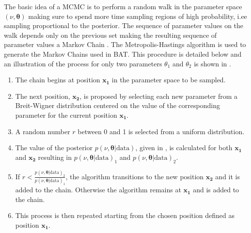 The basic idea of a MCMC is to perform a random walk in the parameter space
$(\nu,\boldsymbol{\theta})$ making sure to spend more time sampling regions of
high probability, i.ee sampling proportional to the posterior.  The sequence of
parameter values on the walk depends only on the previous set making the
resulting sequence of parameter values a Markov Chain \cite{Markov2006}.  The
Metropolis-Hastings algorithm \cite{10.2307/2334940,Beresford:2642397} is used
to generate the Markov Chains used in BAT.  This procedure is detailed below
and an illustration of the process for only two parameters $\theta_{1}$ and
$\theta_{2}$ is shown in .
%
\begin{enumerate}
\item The chain begins at position $\boldsymbol{x_{1}}$ in the parameter space to be sampled.
\item The next position, $\boldsymbol{x_{2}}$, is proposed by selecting each new parameter from a Breit-Wigner distribution centered on the value of the corresponding parameter for the current position $\boldsymbol{x_{1}}$.
\item A random number $r$ between 0 and 1 is selected from a uniform distribution.
\item The value of the posterior $p(\nu,\boldsymbol{\theta}|\text{data})$, given in , is calculated for both  $\boldsymbol{x_{1}}$ and  $\boldsymbol{x_{2}}$ resulting in $p(\nu,\boldsymbol{\theta}|\text{data})_{1}$ and $p(\nu,\boldsymbol{\theta}|\text{data})_{2}$.
\item If $r < \frac{p(\nu,\boldsymbol{\theta}|\text{data})_{2}}{p(\nu,\boldsymbol{\theta}|\text{data})_{1}}$, the algorithm transitions to the new position $\boldsymbol{x_{2}}$ and it is added to the chain. Otherwise the algorithm remains at $\boldsymbol{x_{1}}$ and is added to the chain.
\item This process is then repeated starting from the chosen position defined as position $\boldsymbol{x_{1}}$.
\end{enumerate}

